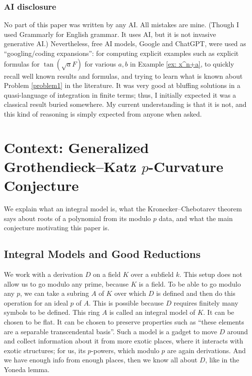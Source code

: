 \documentclass{amsart}
\newcommand{\op}{\operatorname}
\theoremstyle{definition}
\begin{document}
\subsubsection{AI disclosure} No part of this paper was written by any AI. All mistakes are mine. (Though I used Grammarly for English grammar. It uses AI, but it is not invasive generative AI.) Nevertheless, free AI models, Google and ChatGPT, were used as ``googling/coding expansions'': for computing explicit examples such as explicit formulas for $\op{tan}(\sqrt{a}F)$ for various $a,b$ in Example \ref{ex: x^n+a}, to quickly recall well known results and formulas, and trying to learn what is known about Problem \ref{problem1} in the literature. It was very good at bluffing solutions in a quasi-language of integration in finite terms; thus, I initially expected it was a classical result buried somewhere. My current understanding is that it is not, and this kind of reasoning is simply expected from anyone when asked.





\section{Context: Generalized Grothendieck--Katz \texorpdfstring{$p$}{p}-Curvature Conjecture}
We explain what an integral model is, what the Kronecker--Chebotarev theorem says about roots of a polynomial from its modulo $p$ data, and what the main conjecture motivating this paper is. 

\subsection{Integral Models and Good Reductions}

We work with a derivation $D$ on a field $K$ over a subfield $k$. This setup does not allow us to go modulo any prime, because $K$ is a field. To be able to go modulo any $p$, we can take a subring $A$ of $K$ over which $D$ is defined and then do this operation for an ideal $p$ of $A$. This is possible because $D$ requires finitely many symbols to be defined. This ring $A$ is called an integral model of $K$. It can be chosen to be flat. It can be chosen to preserve properties such as ``these elements are a separable transcendental basis''. Such a model is a gadget to move $D$ around and collect information about it from more exotic places, where it interacts with exotic structures; for us, its $p$-powers, which modulo $p$ are again derivations. And we have enough info from enough places, then we know all about $D$, like in the Yoneda lemma.
\end{document}
